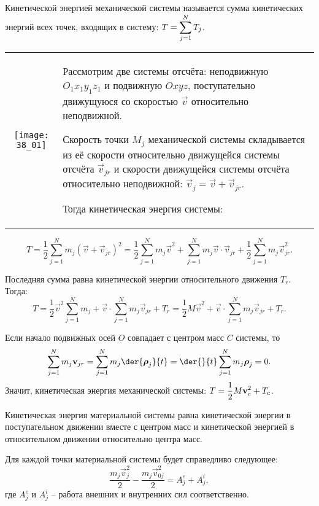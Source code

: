 
Кинетической энергией механической системы называется сумма кинетических энергий
всех точек, входящих в систему: \( \displaystyle T = \sum_{j=1}^N T_j \).

\begin{table}[h!]
\begin{tabular}{C{.4}m{.55\textwidth}}
    \texttt{[image: 38\_01]} &
    Рассмотрим две системы отсчёта: неподвижную \( O_1x_1y_1z_1 \) и подвижную
    \( Oxyz \), поступательно движущуюся со скоростью \( \vec{v} \) относительно
    неподвижной.

    Скорость точки \( M_j \) механической системы складывается из её скорости
    относительно движущейся системы отсчёта \( \vec{v}_{jr} \) и скорости
    движущейся системы отсчёта относительно неподвижной:
    \( \vec{v}_j = \vec{v} + \vec{v}_{jr} \).

Тогда кинетическая энергия системы:
\end{tabular}
\end{table}
\vspace*{-2.5em}
\[
    T = \frac{1}{2}\sum_{j=1}^N m_j(\vec{v} + \vec{v}_{jr})^2 = \frac{1}{2}
    \sum_{j=1}^N m_j\vec{v}^2 + \sum_{j=1}^N m_j\vec{v}\cdot\vec{v}_{jr} +
    \frac{1}{2}\sum_{j=1}^N m_j\vec{v}_{jr}^2.
\]

Последняя сумма равна кинетической энергии относительного движения \( T_r \).
Тогда:
\[
    T = \frac{1}{2}\vec{v}^2\sum_{j=1}^N m_j +
    \vec{v}\cdot\sum_{j=1}^Nm_j\vec{v}_{jr} + T_r =
    \frac{1}{2}M\vec{v}^2 + \vec{v}\cdot\sum_{j=1}^N m_j\vec{v}_{jr} + T_r.
\]

Если начало подвижных осей \( O \) совпадает с центром масс \( C \) системы, то
\[
    \sum_{j=1}^N m_j\vec{v}_{jr} = \sum_{j=1}^N m_j\der{\vec{\rho}_j}{t} =
    \der{}{t}\sum_{j=1}^N m_j\vec{\rho}_j = 0.
\]
Значит, кинетическая энергия механической системы:
\( \displaystyle T = \frac{1}{2}M\boldsymbol{\mathrm{v}}_c^2 + T_c \).

Кинетическая энергия материальной системы равна кинетической энергии в
поступательном движении вместе с центром масс и кинетической энергией в
относительном движении относительно центра масс.

Для каждой точки материальной системы будет справедливо следующее:
\[
    \frac{m_j\vec{v}_j^2}{2} - \frac{m_j\vec{v}_{0j}^2}{2} = A^e_j + A^i_j,
\]
где \( A^e_j \) и \( A^i_j \) -- работа внешних и внутренних сил соответственно.

